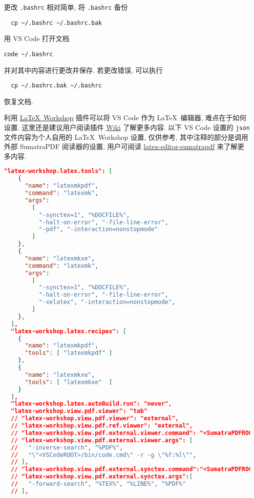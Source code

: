 更改 \texttt{.bashrc} 相对简单,
将 \texttt{.bashrc} 备份
\begin{lstlisting}
  cp ~/.bashrc ~/.bashrc.bak
\end{lstlisting}
用 VS Code 打开文档
\begin{lstlisting}[morekeywords = code]
  code ~/.bashrc
\end{lstlisting}
并对其中内容进行更改并保存.
若更改错误,
可以执行
\begin{lstlisting}
  cp ~/.bashrc.bak ~/.bashrc
\end{lstlisting}
恢复文档.

利用
\href{https://marketplace.visualstudio.com/items?itemName=James-Yu.latex-workshop}{\LaTeX\ Workshop}
插件可以将 VS Code 作为 \LaTeX\ 编辑器,
难点在于如何设置.
这里还是建议用户阅读插件
\href{https://github.com/James-Yu/LaTeX-Workshop/wiki}{Wiki}
了解更多内容.
以下 VS Code 设置的 \texttt{json} 文件内容为个人自用的 \LaTeX\ Workshop 设置,
仅供参考,
其中注释的部分是调用外部 SumatraPDF 阅读器的设置,
用户可阅读
\href{https://github.com/OsbertWang/latex-editor-sumatrapdf}{\textsf{latex-editor-sumatrapdf}}
来了解更多内容.
\begin{lstlisting}[language = json]
  "latex-workshop.latex.tools": [
    {
      "name": "latexmkpdf",
      "command": "latexmk",
      "args":
        [
          "-synctex=1", "%DOCFILE%",
          "-halt-on-error", "-file-line-error",
          "-pdf", "-interaction=nonstopmode"
        ]
    },
    {
      "name": "latexmkxe",
      "command": "latexmk",
      "args":
        [
          "-synctex=1", "%DOCFILE%",
          "-halt-on-error", "-file-line-error", 
          "-xelatex", "-interaction=nonstopmode",
        ]
    },
  ],
  "latex-workshop.latex.recipes": [
    {
      "name": "latexmkpdf",
      "tools": [ "latexmkpdf" ]
    },
    {
      "name": "latexmkxe",
      "tools": [ "latexmkxe"  ]
    }
  ],
  "latex-workshop.latex.autoBuild.run": "never",
  "latex-workshop.view.pdf.viewer": "tab"
  // "latex-workshop.view.pdf.viewer": "external",
  // "latex-workshop.view.pdf.ref.viewer": "external",
  // "latex-workshop.view.pdf.external.viewer.command": "<SumatraPDFROOT>/SumatraPDF.exe",
  // "latex-workshop.view.pdf.external.viewer.args": [
  //   "-inverse-search", "%PDF%",
  //   "\"<VSCodeROOT>/bin/code.cmd\" -r -g \"%f:%l\"",
  // ],
  // "latex-workshop.view.pdf.external.synctex.command":"<SumatraPDFROOT>/SumatraPDF.exe",
  // "latex-workshop.view.pdf.external.synctex.args":[
  //   "-forward-search", "%TEX%", "%LINE%", "%PDF%"
  // ],
\end{lstlisting}

